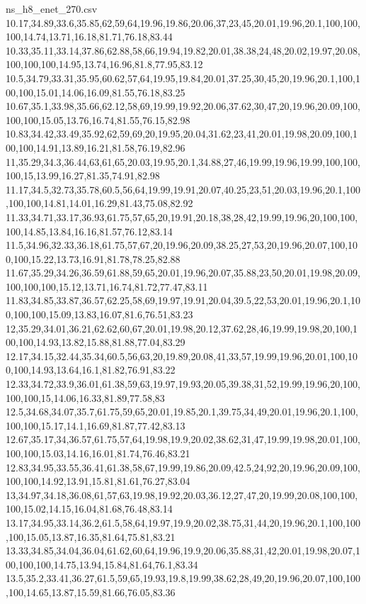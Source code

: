 \begin{filecontents*}[overwrite]{ns_h8_enet_270.csv}
10.17,34.89,33.6,35.85,62,59,64,19.96,19.86,20.06,37,23,45,20.01,19.96,20.1,100,100,100,14.74,13.71,16.18,81.71,76.18,83.44
10.33,35.11,33.14,37.86,62.88,58,66,19.94,19.82,20.01,38.38,24,48,20.02,19.97,20.08,100,100,100,14.95,13.74,16.96,81.8,77.95,83.12
10.5,34.79,33.31,35.95,60.62,57,64,19.95,19.84,20.01,37.25,30,45,20,19.96,20.1,100,100,100,15.01,14.06,16.09,81.55,76.18,83.25
10.67,35.1,33.98,35.66,62.12,58,69,19.99,19.92,20.06,37.62,30,47,20,19.96,20.09,100,100,100,15.05,13.76,16.74,81.55,76.15,82.98
10.83,34.42,33.49,35.92,62,59,69,20,19.95,20.04,31.62,23,41,20.01,19.98,20.09,100,100,100,14.91,13.89,16.21,81.58,76.19,82.96
11,35.29,34.3,36.44,63,61,65,20.03,19.95,20.1,34.88,27,46,19.99,19.96,19.99,100,100,100,15,13.99,16.27,81.35,74.91,82.98
11.17,34.5,32.73,35.78,60.5,56,64,19.99,19.91,20.07,40.25,23,51,20.03,19.96,20.1,100,100,100,14.81,14.01,16.29,81.43,75.08,82.92
11.33,34.71,33.17,36.93,61.75,57,65,20,19.91,20.18,38,28,42,19.99,19.96,20,100,100,100,14.85,13.84,16.16,81.57,76.12,83.14
11.5,34.96,32.33,36.18,61.75,57,67,20,19.96,20.09,38.25,27,53,20,19.96,20.07,100,100,100,15.22,13.73,16.91,81.78,78.25,82.88
11.67,35.29,34.26,36.59,61.88,59,65,20.01,19.96,20.07,35.88,23,50,20.01,19.98,20.09,100,100,100,15.12,13.71,16.74,81.72,77.47,83.11
11.83,34.85,33.87,36.57,62.25,58,69,19.97,19.91,20.04,39.5,22,53,20.01,19.96,20.1,100,100,100,15.09,13.83,16.07,81.6,76.51,83.23
12,35.29,34.01,36.21,62.62,60,67,20.01,19.98,20.12,37.62,28,46,19.99,19.98,20,100,100,100,14.93,13.82,15.88,81.88,77.04,83.29
12.17,34.15,32.44,35.34,60.5,56,63,20,19.89,20.08,41,33,57,19.99,19.96,20.01,100,100,100,14.93,13.64,16.1,81.82,76.91,83.22
12.33,34.72,33.9,36.01,61.38,59,63,19.97,19.93,20.05,39.38,31,52,19.99,19.96,20,100,100,100,15,14.06,16.33,81.89,77.58,83
12.5,34.68,34.07,35.7,61.75,59,65,20.01,19.85,20.1,39.75,34,49,20.01,19.96,20.1,100,100,100,15.17,14.1,16.69,81.87,77.42,83.13
12.67,35.17,34,36.57,61.75,57,64,19.98,19.9,20.02,38.62,31,47,19.99,19.98,20.01,100,100,100,15.03,14.16,16.01,81.74,76.46,83.21
12.83,34.95,33.55,36.41,61.38,58,67,19.99,19.86,20.09,42.5,24,92,20,19.96,20.09,100,100,100,14.92,13.91,15.81,81.61,76.27,83.04
13,34.97,34.18,36.08,61,57,63,19.98,19.92,20.03,36.12,27,47,20,19.99,20.08,100,100,100,15.02,14.15,16.04,81.68,76.48,83.14
13.17,34.95,33.14,36.2,61.5,58,64,19.97,19.9,20.02,38.75,31,44,20,19.96,20.1,100,100,100,15.05,13.87,16.35,81.64,75.81,83.21
13.33,34.85,34.04,36.04,61.62,60,64,19.96,19.9,20.06,35.88,31,42,20.01,19.98,20.07,100,100,100,14.75,13.94,15.84,81.64,76.1,83.34
13.5,35.2,33.41,36.27,61.5,59,65,19.93,19.8,19.99,38.62,28,49,20,19.96,20.07,100,100,100,14.65,13.87,15.59,81.66,76.05,83.36

\end{filecontents*}
